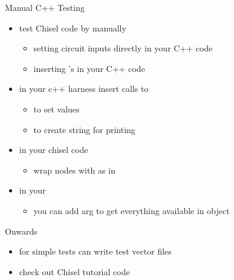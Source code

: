 \documentclass[xcolor=pdflatex,dvipsnames,table]{beamer}
\begin{document}
\begin{frame}[fragile]{Manual C++ Testing}
\begin{itemize}
\item test Chisel code by manually 
\begin{itemize}
\item setting circuit inputs directly in your C++ code
\item inserting 's in your C++ code
\end{itemize}
\item in your c++ harness insert calls to
\begin{itemize}
\item {} to set values
\item {} to create string for printing
\end{itemize}
\item in your chisel code
\begin{itemize}
\item wrap nodes with  as in 
\end{itemize}
\item in your  
\begin{itemize}
\item you can add  arg to get everything available in object
\end{itemize}
\end{itemize}
\end{frame}

\begin{frame}[fragile]{Onwards}
\begin{itemize}
\item for simple tests can write test vector files
\item check out Chisel tutorial code
\end{itemize}
\end{frame}
\end{document}
